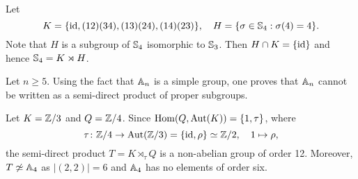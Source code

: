 \begin{example}
Let 
\[
K=\{\operatorname{id},(12)(34),(13)(24),(14)(23)\},\quad  
H=\{\sigma\in\mathbb{S}_4:\sigma(4)=4\}.
\]
Note that $H$ is a subgroup of 
$\mathbb{S}_4$ isomorphic to $\mathbb{S}_3$. Then $H\cap K=\{\operatorname{id}\}$ and hence 
$\mathbb{S}_4=K\rtimes H$.
\end{example}

Let $n\geq5$. 
Using the fact that $\mathbb{A}_n$ is a simple group,  
one proves that $\mathbb{A}_n$ cannot be written as a semi-direct product of proper subgroups. 

\begin{example}
Let $K=\mathbb{Z}/3$ and $Q=\mathbb{Z}/4$. Since $\operatorname{Hom}(Q,\operatorname{Aut}(K))=\{1,\tau\}$, where 
\[
\tau\colon\mathbb{Z}/4\to\operatorname{Aut}(\mathbb{Z}/3)=\{\operatorname{id},\rho\}\simeq\mathbb{Z}/2,\quad 1\mapsto\rho,
\]
the semi-direct product $T=K\rtimes_\tau Q$ is a non-abelian group of order 12. Moreover,
$T\not\simeq\mathbb{A}
_4$ as $|(2,2)|=6$ and $\mathbb{A}_4$ has no elements of order six.
\end{example}


